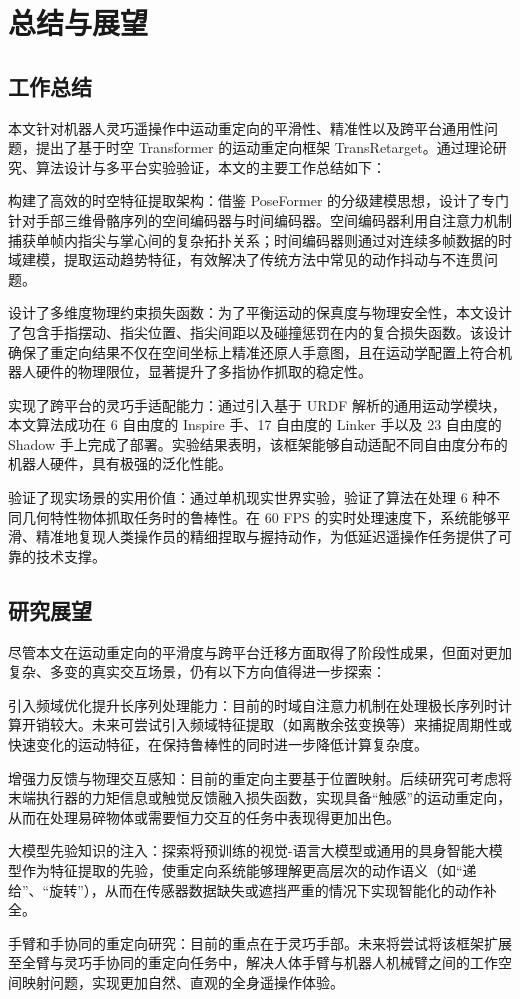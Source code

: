 \chapter{总结与展望}

\section{工作总结}
本文针对机器人灵巧遥操作中运动重定向的平滑性、精准性以及跨平台通用性问题，提出了基于时空 Transformer 的运动重定向框架 TransRetarget。通过理论研究、算法设计与多平台实验验证，本文的主要工作总结如下：

构建了高效的时空特征提取架构：借鉴 PoseFormer 的分级建模思想，设计了专门针对手部三维骨骼序列的空间编码器与时间编码器。空间编码器利用自注意力机制捕获单帧内指尖与掌心间的复杂拓扑关系；时间编码器则通过对连续多帧数据的时域建模，提取运动趋势特征，有效解决了传统方法中常见的动作抖动与不连贯问题。

设计了多维度物理约束损失函数：为了平衡运动的保真度与物理安全性，本文设计了包含手指摆动、指尖位置、指尖间距以及碰撞惩罚在内的复合损失函数。该设计确保了重定向结果不仅在空间坐标上精准还原人手意图，且在运动学配置上符合机器人硬件的物理限位，显著提升了多指协作抓取的稳定性。

实现了跨平台的灵巧手适配能力：通过引入基于 URDF 解析的通用运动学模块，本文算法成功在 6 自由度的 Inspire 手、17 自由度的 Linker 手以及 23 自由度的 Shadow 手上完成了部署。实验结果表明，该框架能够自动适配不同自由度分布的机器人硬件，具有极强的泛化性能。

验证了现实场景的实用价值：通过单机现实世界实验，验证了算法在处理 6 种不同几何特性物体抓取任务时的鲁棒性。在 60 FPS 的实时处理速度下，系统能够平滑、精准地复现人类操作员的精细捏取与握持动作，为低延迟遥操作任务提供了可靠的技术支撑。

\section{研究展望}
尽管本文在运动重定向的平滑度与跨平台迁移方面取得了阶段性成果，但面对更加复杂、多变的真实交互场景，仍有以下方向值得进一步探索：

引入频域优化提升长序列处理能力：目前的时域自注意力机制在处理极长序列时计算开销较大。未来可尝试引入频域特征提取（如离散余弦变换等）来捕捉周期性或快速变化的运动特征，在保持鲁棒性的同时进一步降低计算复杂度。

增强力反馈与物理交互感知：目前的重定向主要基于位置映射。后续研究可考虑将末端执行器的力矩信息或触觉反馈融入损失函数，实现具备“触感”的运动重定向，从而在处理易碎物体或需要恒力交互的任务中表现得更加出色。

大模型先验知识的注入：探索将预训练的视觉-语言大模型或通用的具身智能大模型作为特征提取的先验，使重定向系统能够理解更高层次的动作语义（如“递给”、“旋转”），从而在传感器数据缺失或遮挡严重的情况下实现智能化的动作补全。

手臂和手协同的重定向研究：目前的重点在于灵巧手部。未来将尝试将该框架扩展至全臂与灵巧手协同的重定向任务中，解决人体手臂与机器人机械臂之间的工作空间映射问题，实现更加自然、直观的全身遥操作体验。

